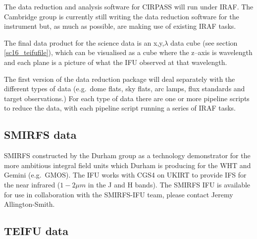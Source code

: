\documentclass[twoside,11pt]{article}
\newcommand{\htmladdnormallink}[2]{#1}
\newcommand{\htmlref}[2]{#1}
\newcommand{\xlabel}[1]{}
\begin{document}
The data reduction and analysis software for CIRPASS will run under IRAF. The Cambridge group is currently still writing the data reduction software for the instrument but, as much as possible, are making use of existing IRAF tasks.

The final data product for the science data is an x,y,$\lambda$ data cube (see section \ref{sc16_teifufile}), which can be visualised as a cube where the z--axis is wavelength and each plane is a picture of what the IFU
observed at that wavelength. 

The first version of the \htmladdnormallink{data reduction package}{http://www.ast.cam.ac.uk/~optics/cirpass/docs/soft_spec.html} will deal separately with the different types of data (e.g.\ dome flats, sky flats, arc lamps, flux standards and target observations.) For each type of data there are one or more pipeline scripts to reduce the data, with each pipeline script running a series of IRAF tasks.


\subsection{\xlabel{sc16_smirfs}SMIRFS data\label{sc16_smirfs}}

\htmladdnormallink{SMIRFS}{http://star-www.dur.ac.uk/~jra/ukirt_ifu.html} constructed by the Durham group as a technology demonstrator for the more ambitious integral field units which Durham is producing for the WHT and Gemini (e.g.\ \htmlref{GMOS}{sc16_gmos}). The IFU works with \htmladdnormallink{CGS4}{http://www.jach.hawaii.edu/JACpublic/UKIRT/instruments/cgs4/handbook.html} on \htmladdnormallink{UKIRT}{http://www.jach.hawaii.edu/JACpublic/UKIRT/} to provide IFS for the near infrared ($1-2 \mu m$ in the J and H bands). The SMIRFS IFU is available for use in collaboration with the SMIRFS-IFU team, please contact \htmladdnormallink{Jeremy Allington-Smith}{mailto:J.R.Allington-Smith@durham.ac.uk}. 


\subsection{\xlabel{sc16_teifu}TEIFU data\label{sc16_teifu}}
\end{document}

